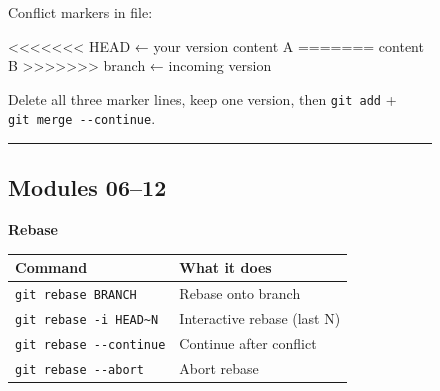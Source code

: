 \documentclass[
  9pt,
  a4paper,
  DIV=11,
  numbers=noendperiod]{scrartcl}
\newenvironment{Shaded}{\begin{snugshade}}{\end{snugshade}}
\newcommand{\NormalTok}[1]{\textcolor[rgb]{0.00,0.23,0.31}{#1}}
\begin{document}
\begin{figure}
\begin{minipage}{0.50\linewidth}
\end{minipage}%
\newline
\begin{minipage}{0.50\linewidth}
Conflict markers in file:\end{minipage}%
%
\begin{minipage}{0.50\linewidth}

\begin{Shaded}
\begin{Highlighting}[]
\NormalTok{\textless{}\textless{}\textless{}\textless{}\textless{}\textless{}\textless{} HEAD        ← your version}
\NormalTok{content A}
\NormalTok{=======}
\NormalTok{content B}
\NormalTok{\textgreater{}\textgreater{}\textgreater{}\textgreater{}\textgreater{}\textgreater{}\textgreater{} branch      ← incoming version}
\end{Highlighting}
\end{Shaded}

\end{minipage}%
\newline
\begin{minipage}{0.50\linewidth}
Delete all three marker lines, keep one version, then \texttt{git\ add}
+ \texttt{git\ merge\ -\/-continue}.\end{minipage}%
%
\begin{minipage}{0.50\linewidth}

\begin{center}\rule{0.5\linewidth}{0.5pt}\end{center}

\end{minipage}%
\newline
\begin{minipage}{0.50\linewidth}

\subsection{Modules 06--12}\label{modules-0612}

\textbf{Rebase}\end{minipage}%
%
\begin{minipage}{0.50\linewidth}

\begin{longtable}[]{@{}ll@{}}
\toprule\noalign{}
Command & What it does \\
\midrule\noalign{}
\endhead
\bottomrule\noalign{}
\endlastfoot
\texttt{git\ rebase\ BRANCH} & Rebase onto branch \\
\texttt{git\ rebase\ -i\ HEAD\textasciitilde{}N} & Interactive rebase
(last N) \\
\texttt{git\ rebase\ -\/-continue} & Continue after conflict \\
\texttt{git\ rebase\ -\/-abort} & Abort rebase \\
\end{longtable}


\end{minipage}
\end{figure}
\end{document}
